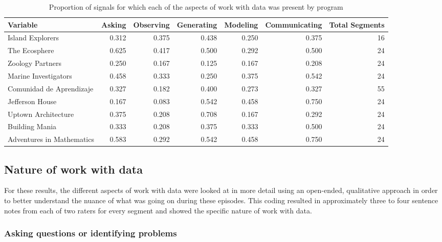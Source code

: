 \documentclass[]{msu-thesis}
\theoremstyle{definition}
\theoremstyle{definition}
\theoremstyle{definition}
\theoremstyle{remark}
\begin{document}
\begin{landscape}\begin{table}

\caption{\label{tab:unnamed-chunk-10}Proportion of signals for which each of the aspects of work with data was present by program}
\centering
\begin{tabular}[t]{lrrrrrr}
\toprule
Variable & Asking & Observing & Generating & Modeling & Communicating & Total Segments\\
\midrule
Island Explorers & 0.312 & 0.375 & 0.438 & 0.250 & 0.375 & 16\\
The Ecosphere & 0.625 & 0.417 & 0.500 & 0.292 & 0.500 & 24\\
Zoology Partners & 0.250 & 0.167 & 0.125 & 0.167 & 0.208 & 24\\
Marine Investigators & 0.458 & 0.333 & 0.250 & 0.375 & 0.542 & 24\\
Comunidad de Aprendizaje & 0.327 & 0.182 & 0.400 & 0.273 & 0.327 & 55\\
Jefferson House & 0.167 & 0.083 & 0.542 & 0.458 & 0.750 & 24\\
Uptown Architecture & 0.375 & 0.208 & 0.708 & 0.167 & 0.292 & 24\\
Building Mania & 0.333 & 0.208 & 0.375 & 0.333 & 0.500 & 24\\
Adventures in Mathematics & 0.583 & 0.292 & 0.542 & 0.458 & 0.750 & 24\\
\bottomrule
\end{tabular}
\end{table}
\end{landscape}

\subsection{Nature of work with data}\label{nature-of-work-with-data}

For these results, the different aspects of work with data were looked
at in more detail using an open-ended, qualitative approach in order to
better understand the nuance of what was going on during these episodes.
This coding resulted in approximately three to four sentence notes from
each of two raters for every segment and showed the specific nature of
work with data.

\subsubsection{Asking questions or identifying
problems}\label{asking-questions-or-identifying-problems}
\end{document}
